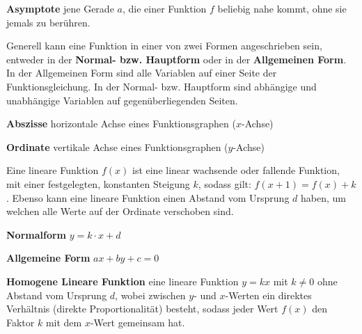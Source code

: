 \textbf{Asymptote}  jene Gerade $a$, die einer Funktion $f$ beliebig nahe kommt, ohne sie jemals zu ber\"{u}hren.

\begin{figure}[h!]
	\centering
\end{figure}

\pagebreak


Generell kann eine Funktion in einer von zwei Formen angeschrieben sein, entweder in der \textbf{Normal- bzw. Hauptform} oder in der \textbf{Allgemeinen Form}. In der Allgemeinen Form sind alle Variablen auf einer Seite der Funktionsgleichung. In der Normal- bzw. Hauptform sind abh\"{a}ngige und unabh\"{a}ngige Variablen auf gegen\"{u}berliegenden Seiten.

\textbf{Abszisse}  horizontale Achse eines Funktionsgraphen ($x$-Achse)

\textbf{Ordinate}  vertikale Achse eines Funktionsgraphen ($y$-Achse)


Eine lineare Funktion $f(x)$ ist eine linear wachsende oder fallende Funktion, mit einer festgelegten, konstanten Steigung $k$, sodass gilt: $f(x + 1) = f(x) + k$. Ebenso kann eine lineare Funktion einen Abstand vom Ursprung $d$ haben, um welchen alle Werte auf der Ordinate verschoben sind.

\textbf{Normalform}  $y = k \cdot x + d$

\textbf{Allgemeine Form}  $ax + by + c = 0$

\textbf{Homogene Lineare Funktion}  eine lineare Funktion $y = kx$ mit $k \neq 0$ ohne Abstand vom Ursprung $d$, wobei zwischen $y$- und $x$-Werten ein direktes Verh\"{a}ltnis (direkte Proportionalit\"{a}t) besteht, sodass jeder Wert $f(x)$ den Faktor $k$ mit dem $x$-Wert gemeinsam hat.

